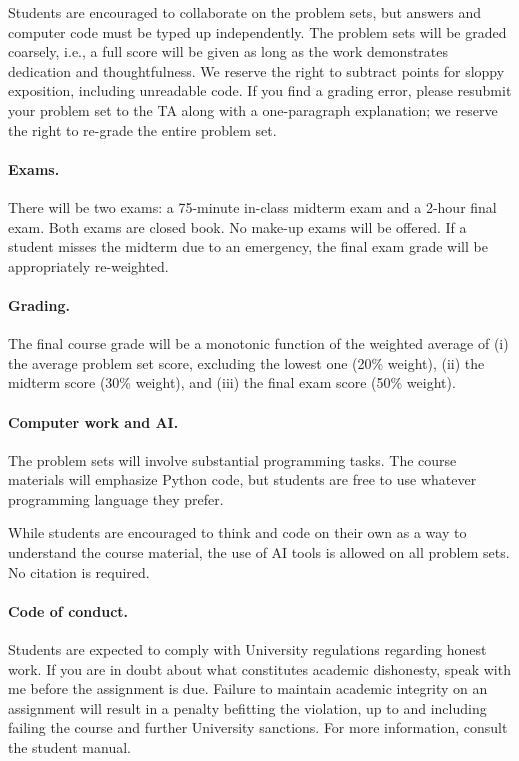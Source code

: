 \documentclass[12pt]{article}
\begin{document}
Students are encouraged to collaborate on the problem sets, but answers and computer code must be typed up independently. The problem sets will be graded coarsely, i.e., a full score will be given as long as the work demonstrates dedication and thoughtfulness. We reserve the right to subtract points for sloppy exposition, including unreadable code. If you find a grading error, please resubmit your problem set to the TA along with a one-paragraph explanation; we reserve the right to re-grade the entire problem set.

\paragraph{Exams.}
There will be two exams: a 75-minute in-class midterm exam and a 2-hour final exam. Both exams are closed book. No make-up exams will be offered. If a student misses the midterm due to an emergency, the final exam grade will be appropriately re-weighted.

\paragraph{Grading.}
The final course grade will be a monotonic function of the weighted average of (i) the average problem set score, excluding the lowest one (20\% weight), (ii) the midterm score (30\% weight), and (iii) the final exam score (50\% weight).

\paragraph{Computer work and AI.}
The problem sets will involve substantial programming tasks. The course materials will emphasize Python code, but students are free to use whatever programming language they prefer.

While students are encouraged to think and code on their own as a way to understand the course material, the use of AI tools is allowed on all problem sets. No citation is required.

\paragraph{Code of conduct.}
Students are expected to comply with University regulations regarding honest work. If you are in doubt about what constitutes academic dishonesty, speak with me before the assignment is due. Failure to maintain academic integrity on an assignment will result in a penalty befitting the violation, up to and including failing the course and further University sanctions. For more information, consult the student manual.
\end{document}
